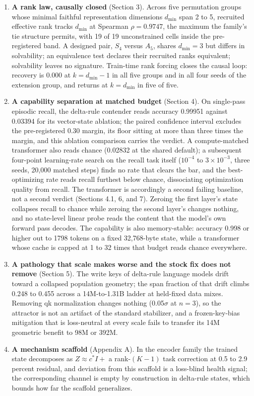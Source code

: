 \begin{enumerate}
\item \textbf{A rank law, causally closed} (Section 3). Across five permutation groups whose minimal faithful representation dimensions $d_{\min}$ span 2 to 5, recruited effective rank tracks $d_{\min}$ at Spearman $\rho = 0.9747$, the maximum the family's tie structure permits, with 19 of 19 unconstrained cells inside the pre-registered band. A designed pair, $S_4$ versus $A_5$, shares $d_{\min}=3$ but differs in solvability; an equivalence test declares their recruited ranks equivalent; solvability leaves no signature. Train-time rank forcing closes the causal loop: recovery is 0.000 at $k = d_{\min}-1$ in all five groups and in all four seeds of the extension group, and returns at $k = d_{\min}$ in five of five.
\item \textbf{A capability separation at matched budget} (Section 4). On single-pass episodic recall, the delta-rule contender reads accuracy 0.99951 against 0.03394 for its vector-state ablation; the paired confidence interval excludes the pre-registered 0.30 margin, its floor sitting at more than three times the margin, and this ablation comparison carries the verdict. A compute-matched transformer also reads chance (0.02832 at the shared default); a subsequent four-point learning-rate search on the recall task itself ($10^{-4}$ to $3\times10^{-3}$, three seeds, 20,000 matched steps) finds no rate that clears the bar, and the best-optimizing rate reads recall furthest below chance, dissociating optimization quality from recall. The transformer is accordingly a second failing baseline, not a second verdict (Sections 4.1, 6, and 7). Zeroing the first layer's state collapses recall to chance while zeroing the second layer's changes nothing, and no state-level linear probe reads the content that the model's own forward pass decodes. The capability is also memory-stable: accuracy 0.998 or higher out to 1798 tokens on a fixed 32,768-byte state, while a transformer whose cache is capped at 1 to 32 times that budget reads chance everywhere.
\item \textbf{A pathology that scale makes worse and the stock fix does not remove} (Section 5). The write keys of delta-rule language models drift toward a collapsed population geometry; the span fraction of that drift climbs 0.248 to 0.455 across a 14M-to-1.31B ladder at held-fixed data mixes. Removing qk normalization changes nothing (0.05$\sigma$ at $n{=}3$), so the attractor is not an artifact of the standard stabilizer, and a frozen-key-bias mitigation that is loss-neutral at every scale fails to transfer its 14M geometric benefit to 98M or 392M.
\item \textbf{A mechanism scaffold} (Appendix A). In the encoder family the trained state decomposes as $Z \approx c^{*} I + $ a rank-$(K{-}1)$ task correction at 0.5 to 2.9 percent residual, and deviation from this scaffold is a loss-blind health signal; the corresponding channel is empty by construction in delta-rule states, which bounds how far the scaffold generalizes.
\end{enumerate}

